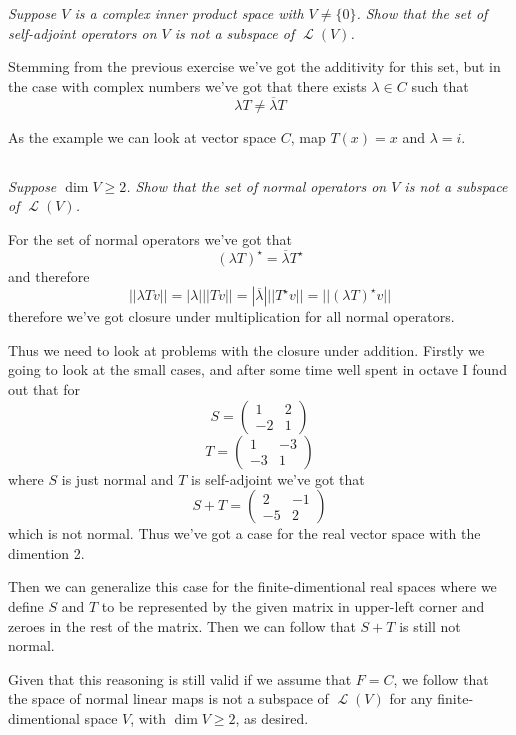\documentclass[11pt,oneside,titlepage]{book}
\DeclareMathOperator \map {\mathcal {L}}
\begin{document}
\textit{Suppose $V$ is a complex inner product space with $V \neq \{0\}$. Show that
  the set of self-adjoint operators on $V$ is not a subspace of $\map(V)$.}

Stemming from the previous exercise we've got the additivity for this set, but in the case
with complex numbers we've got that there exists $\lambda \in C$ such that
$$\lambda T \neq \overline{\lambda} T$$

As the example we can look at vector space $C$, map $T(x) = x$ and $\lambda = i$.

\subsection{}

\textit{Suppose $\dim V \geq 2$. Show that the set of normal operators on $V$ is not a subspace
  of $\map(V)$.}

For the set of normal operators we've got that
$$(\lambda T)^\star = \overline{\lambda} T^\star$$
and therefore 
$$||\lambda T v|| = |\lambda| ||T v|| = |\overline{\lambda}| ||T^\star v||
= ||(\lambda T)^\star v||$$
therefore we've got closure under multiplication for all normal operators.

Thus we need to look at problems with the closure under addition. Firstly we going to
look at the small cases, and after some time well spent in octave I found out that for
$$S =
\begin{pmatrix}
  1 & 2 \\
  -2 & 1
\end{pmatrix}
$$
$$
T =
\begin{pmatrix}
  1 & -3 \\
  -3 & 1 
\end{pmatrix}
$$
where $S$ is just normal and $T$ is self-adjoint we've got that
$$
S + T =
\begin{pmatrix}
  2 & -1 \\
  -5 & 2
\end{pmatrix}
$$
which is not normal. Thus we've got a case for the real vector space with the dimention 2.

Then we can generalize this case for the finite-dimentional real spaces where we define
$S$ and $T$ to be represented by the given matrix in upper-left corner and zeroes in the rest
of the matrix. Then we can follow that $S + T$ is still not normal.

Given that this reasoning is still valid if we assume that $F = C$, we follow that
the space of normal linear maps is not a subspace of $\map(V)$ for any finite-dimentional
space $V$, with $\dim V \geq 2$, as desired.
\end{document}
